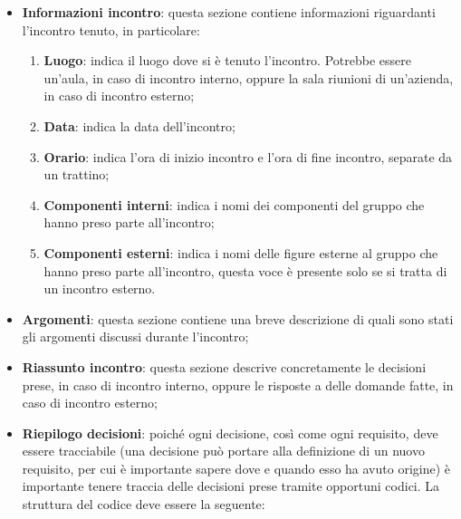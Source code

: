                     \begin{itemize}
                        \item \textbf{Informazioni incontro}: questa sezione contiene informazioni
                        riguardanti l'incontro tenuto, in particolare:

                        \begin{enumerate}
                            \item \textbf{Luogo}: indica il luogo dove si è tenuto l'incontro.
                            Potrebbe essere un'aula, in caso di incontro interno, oppure la sala riunioni
                            di un'azienda, in caso di incontro esterno;
                            \item \textbf{Data}: indica la data dell'incontro;
                            \item \textbf{Orario}: indica l'ora di inizio incontro e l'ora di fine incontro,
                            separate da un trattino;
                            \item \textbf{Componenti interni}: indica i nomi dei componenti del gruppo che
                            hanno preso parte all'incontro;
                            \item \textbf{Componenti esterni}: indica i nomi delle figure esterne al gruppo che
                            hanno preso parte all'incontro, questa voce è presente solo se si tratta di un incontro
                            esterno.
                        \end{enumerate}

                        \item \textbf{Argomenti}: questa sezione contiene una breve descrizione di quali
                        sono stati gli argomenti discussi durante l'incontro;
                        \item \textbf{Riassunto incontro}: questa sezione descrive concretamente le
                        decisioni prese, in caso di incontro interno, oppure le risposte a delle domande
                        fatte, in caso di incontro esterno;
                        \item \textbf{Riepilogo decisioni}: poiché ogni decisione, così come ogni
                        requisito, deve essere tracciabile (una decisione può portare alla definizione di
                        un nuovo requisito, per cui è importante sapere dove e quando esso ha avuto origine)
                        è importante tenere traccia delle decisioni prese tramite opportuni codici.
                        La struttura del codice deve essere la seguente:


\end{itemize}
